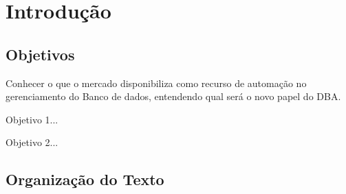 \chapter{Introdução}

\lipsum[1-2]

\section{Objetivos}

Conhecer o que o mercado disponibiliza como recurso de automação no gerenciamento do Banco de dados, entendendo qual será o novo papel do DBA.

\begin{alineas}
\item Objetivo 1...
\item Objetivo 2...
\end{alineas} 

\section{Organização do Texto}

\lipsum[5-6]
